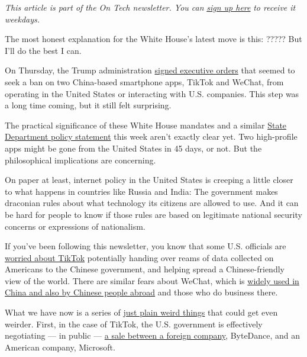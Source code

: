 \emph{This article is part of the On Tech newsletter. You can}
\href{https://www.nytimes3xbfgragh.onion/newsletters/signup/OT}{\emph{sign
up here}} \emph{to receive it weekdays.}

The most honest explanation for the White House's latest move is this:
????? But I'll do the best I can.

On Thursday, the Trump administration
\href{https://www.nytimes3xbfgragh.onion/2020/08/06/technology/trump-wechat-tiktok-china.html}{signed
executive orders} that seemed to seek a ban on two China-based
smartphone apps, TikTok and WeChat, from operating in the United States
or interacting with U.S. companies. This step was a long time coming,
but it still felt surprising.

The practical significance of these White House mandates and a similar
\href{https://www.state.gov/announcing-the-expansion-of-the-clean-network-to-safeguard-americas-assets/}{State
Department policy statement} this week aren't exactly clear yet. Two
high-profile apps might be gone from the United States in 45 days, or
not. But the philosophical implications are concerning.

On paper at least, internet policy in the United States is creeping a
little closer to what happens in countries like Russia and India: The
government makes draconian rules about what technology its citizens are
allowed to use. And it can be hard for people to know if those rules are
based on legitimate national security concerns or expressions of
nationalism.

If you've been following this newsletter, you know that some U.S.
officials are
\href{https://www.nytimes3xbfgragh.onion/2020/07/26/technology/tiktok-china-ban-model.html}{worried
about TikTok} potentially handing over reams of data collected on
Americans to the Chinese government, and helping spread a
Chinese-friendly view of the world. There are similar fears about
WeChat, which is
\href{https://www.nytimes3xbfgragh.onion/2020/08/07/business/trump-china-wechat-tiktok.html}{widely
used in China and also by Chinese people abroad} and those who do
business there.

What we have now is a series of
\href{https://www.nytimes3xbfgragh.onion/2020/08/03/technology/tiktok-microsoft.html}{just
plain weird things} that could get even weirder. First, in the case of
TikTok, the U.S. government is effectively negotiating --- in public ---
\href{https://www.nytimes3xbfgragh.onion/2020/08/03/technology/trump-tiktok-microsoft.html}{a
sale between a foreign company}, ByteDance, and an American company,
Microsoft.

